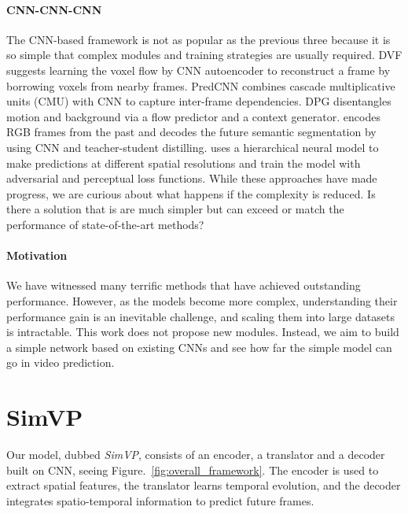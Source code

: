\documentclass[10pt,twocolumn,letterpaper]{article}
\begin{document}
\vspace{-3mm}
\paragraph{CNN-CNN-CNN} The CNN-based framework is not as popular as the previous three because it is so simple that complex modules and training strategies are usually required. DVF \cite{liu2017video} suggests learning the voxel flow by CNN autoencoder to reconstruct a frame by borrowing voxels from nearby frames. PredCNN \cite{xu2018predcnn} combines cascade multiplicative units (CMU) with CNN to capture inter-frame dependencies. DPG \cite{gao2019disentangling} disentangles motion and background via a flow predictor and a context generator. \cite{chiu2020segmenting} encodes RGB frames from the past and decodes the future semantic segmentation by using CNN and teacher-student distilling. \cite{shouno2020photo} uses a hierarchical neural model to make predictions at different spatial resolutions and train the model with adversarial and perceptual loss functions. While these approaches have made progress, we are curious about what happens if the complexity is reduced. Is there a solution that is are much simpler but can exceed or match the performance of state-of-the-art methods?

\vspace{-3mm}
\paragraph{Motivation} We have witnessed many terrific methods that have achieved outstanding performance. However, as the models become more complex, understanding their performance gain is an inevitable challenge, and scaling them into large datasets is intractable. This work does not propose new modules. Instead, we aim to build a simple network based on existing CNNs and see how far the simple model can go in video prediction. 

\section{SimVP}
\label{sec:method}
Our model, dubbed \textit{SimVP}, consists of an encoder, a translator and a decoder built on CNN, seeing Figure.~\ref{fig:overall_framework}. The encoder is used to extract spatial features, the translator learns temporal evolution, and the decoder integrates spatio-temporal information to predict future frames. 

\vspace{-3mm}
\end{document}
